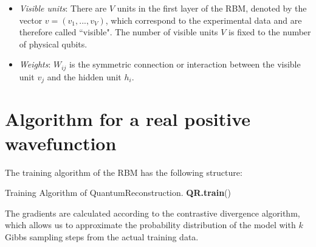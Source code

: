 \documentclass[submission, Phys, hidelinks]{SciPost}
\begin{document}
\begin{itemize}
	\item {\it Visible units}: There are $V$ units in the first layer of the RBM, denoted by the vector $v=(v_1, ..., v_V)$, which correspond to the experimental data and are therefore called ``visible". The number of visible units $V$ is fixed to the number of physical qubits.

	\item {\it Weights}: $W_{ij}$ is the symmetric connection or interaction between the visible unit $v_j$ and the hidden unit $h_i$.

\end{itemize}



	\section{Algorithm for a real positive wavefunction}
	The training algorithm of the RBM has the following structure:

	\begin{algorithm}[H]
		\caption{Training Algorithm of QuantumReconstruction. \textbf{QR.train}() }
		\SetAlgoLined

	\end{algorithm}


	The gradients are calculated according to the contrastive divergence algorithm, which allows us to approximate the probability distribution of the model with $k$ Gibbs sampling steps from the actual training data.
\end{document}
